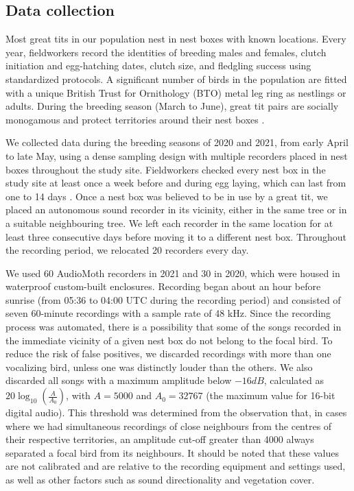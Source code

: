 \subsection{Data collection}
Most great tits in our population nest in nest boxes with known locations. Every year, fieldworkers record the identities of breeding males and females, clutch initiation and egg-hatching dates, clutch size, and fledgling success using standardized protocols. A significant number of birds in the population are fitted with a unique British Trust for Ornithology (BTO) metal leg ring as nestlings or adults. During the breeding season (March to June), great tit pairs are socially monogamous and protect territories around their nest boxes \parencite{hinde1952}.

We collected data during the breeding seasons of 2020 and 2021, from early April to late May, using a dense sampling design with multiple recorders placed in nest boxes throughout the study site. Fieldworkers checked every nest box in the study site at least once a week before and during egg laying, which can last from one to 14 days \parencite{Perrins1965}. Once a nest box was believed to be in use by a great tit, we placed an autonomous sound recorder in its vicinity, either in the same tree or in a suitable neighbouring tree. We left each recorder in the same location for at least three consecutive days before moving it to a different nest box. Throughout the recording period, we relocated 20 recorders every day.

We used 60 AudioMoth recorders \parencite{hill2019} in 2021 and 30 in 2020, which were housed in waterproof custom-built enclosures. Recording began about an hour before sunrise (from 05:36 to 04:00 UTC during the recording period) and consisted of seven 60-minute recordings with a sample rate of 48 kHz. Since the recording process was automated, there is a possibility that some of the songs recorded in the immediate vicinity of a given nest box do not belong to the focal bird. To reduce the risk of false positives, we discarded recordings with more than one vocalizing bird, unless one was distinctly louder than the others. We also discarded all songs with a maximum amplitude below $-16 dB$, calculated as $20\log_{10} \left (\frac{A}{A_{0}}\right )$, with $A = 5000$ and $A_{0} = 32767$ (the maximum value for 16-bit digital audio). This threshold was determined from the observation that, in cases where we had simultaneous recordings of close neighbours from the centres of their respective territories, an amplitude cut-off greater than 4000 always separated a focal bird from its neighbours. It should be noted that these values are not calibrated and are relative to the recording equipment and settings used, as well as other factors such as sound directionality and vegetation cover.

